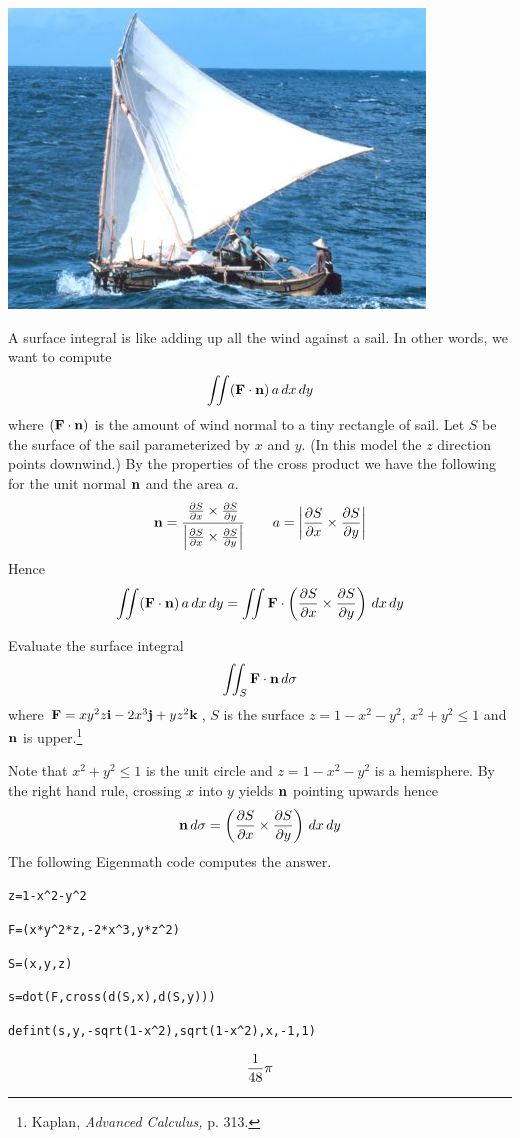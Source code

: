 
\newpage

\begin{center}
\noindent
\includegraphics[scale=0.5]{sailboat.png}
\end{center}

\bigskip
\noindent
A surface integral is like adding up all the wind against a sail.
In other words, we want to compute
$$\int\!\!\!\int({\bf F\cdot n})\,a\,dx\,dy$$
where $({\bf F\cdot n})$ is the amount of wind normal to a tiny rectangle
of sail.
Let $S$ be the surface of the sail parameterized by $x$ and $y$.
(In this model the $z$ direction points downwind.)
By the properties of the cross product we have the following for the unit normal $\bf n$
and the area $a$.
$${\bf n}={ {{\partial S\over\partial x}\times{\partial S\over\partial y}}\over
 {\left|{\partial S\over\partial x}\times{\partial S\over\partial y}\right|}}\qquad
a=\left|{\partial S\over\partial x}\times{\partial S\over\partial y}\right|$$
Hence
$$\int\!\!\!\int({\bf F\cdot n})\,a\,dx\,dy=\int\!\!\!\int{\bf F}\cdot
\left({{\partial S\over\partial x}\times{\partial S\over\partial y}}\right)\,dx\,dy$$

\newpage

\noindent
Evaluate the surface integral
$$\int\!\!\!\int_S{\bf F\cdot n}\,d\sigma$$
where ${\bf F}=xy^2z{\bf i}-2x^3{\bf j}+yz^2{\bf k}$, $S$ is the surface
$z=1-x^2-y^2$, $x^2+y^2\le1$ and $\bf n$ is upper.\footnote{
Kaplan, {\it Advanced Calculus,} p. 313.}

\medskip
\noindent
Note that $x^2+y^2\le1$ is the unit circle and $z=1-x^2-y^2$ is a hemisphere.
By the right hand rule, crossing $x$ into $y$ yields $\bf n$ pointing upwards hence
$${\bf n}\,d\sigma=\left({{\partial S\over\partial x}\times{\partial S\over\partial y}}\right)\,dx\,dy$$
The following Eigenmath code computes the answer.

\medskip
\verb$z=1-x^2-y^2$

\verb$F=(x*y^2*z,-2*x^3,y*z^2)$

\verb$S=(x,y,z)$

\verb$s=dot(F,cross(d(S,x),d(S,y)))$

\verb$defint(s,y,-sqrt(1-x^2),sqrt(1-x^2),x,-1,1)$

$${1\over48}\pi$$

